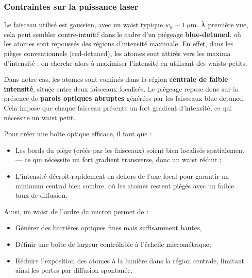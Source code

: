 
\subsubsection*{Contraintes sur la puissance laser}

Le faisceau utilisé est gaussien, avec un waist typique $w_0 \sim 1~\mu\text{m}$. À première vue, cela peut sembler contre-intuitif dans le cadre d’un piégeage \textbf{blue-detuned}, où les atomes sont repoussés des régions d’intensité maximale. En effet, dans les pièges conventionnels (red-detuned), les atomes sont attirés vers les maxima d’intensité ; on cherche alors à maximiser l’intensité en utilisant des waists petits. 

Dans notre cas, les atomes sont confinés dans la région \textbf{centrale de faible intensité}, située entre deux faisceaux focalisés. Le piégeage repose donc sur la présence de \textbf{parois optiques abruptes} générées par les faisceaux blue-detuned. Cela impose que chaque faisceau présente un fort gradient d’intensité, ce qui nécessite un waist petit.

Pour créer une boîte optique efficace, il faut que :
\begin{itemize}
  \item Les bords du piège (créés par les faisceaux) soient bien localisés spatialement — ce qui nécessite un fort gradient transverse, donc un waist réduit ;
  \item L’intensité décroit rapidement en dehors de l’axe focal pour garantir un minimum central bien sombre, où les atomes restent piégés avec un faible taux de diffusion.
\end{itemize}

Ainsi, un waist de l’ordre du micron permet de :
\begin{itemize}
  \item Générer des barrières optiques fines mais suffisamment hautes,
  \item Définir une boîte de largeur contrôlable à l’échelle micrométrique,
  \item Réduire l’exposition des atomes à la lumière dans la région centrale, limitant ainsi les pertes par diffusion spontanée.
\end{itemize}

